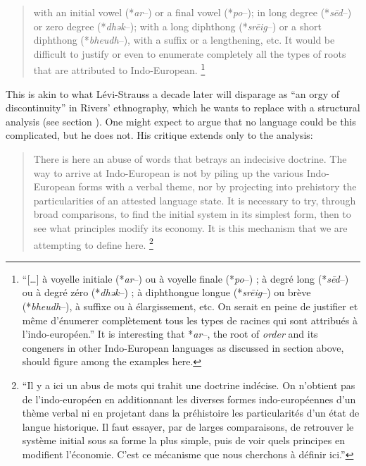 \documentclass[output=paper]{langscibook}
\begin{document}
\begin{quotation}
with an initial vowel (*\emph{ar}--) or a final vowel (*\emph{po}--); in long degree (*\emph{sēd}--) or zero degree (*\emph{dhək}--); with a long diphthong (*\emph{srēig}--) or a short diphthong (*\emph{bheudh}--), with a suffix or a lengthening, etc. It would be difficult to justify or even to enumerate completely all the types of roots that are attributed to Indo-European. \citep[147]{Benveniste1935}\footnote{``[…] à voyelle initiale (*\emph{ar}--) ou à voyelle finale (*\emph{po}--) ; à degré long (*\emph{sēd}--) ou à degré zéro (*\emph{dhək}--) ; à diphthongue longue (*\emph{srēig}--) ou brève (*\emph{bheudh}--), à suffixe ou à élargissement, etc. On serait en peine de justifier et même d’énumerer complètement tous les types de racines qui sont attribués à l’indo-européen.'' It is interesting that *\emph{ar}--, the root of \emph{order} and its congeners in other Indo-European languages as discussed in section  above, should figure among the examples here.}
\end{quotation}

This is akin to what Lévi-Strauss a decade later will disparage as ``an orgy of discontinuity'' in Rivers' ethnography, which he wants to replace with a structural analysis (see section ). One might expect {\Benveniste} to argue that no language could be this complicated, but he does not. His critique extends only to the analysis:

\begin{quotation}
There is here an abuse of words that betrays an indecisive doctrine. The way to arrive at Indo-European is not by piling up the various Indo-Eu\-ro\-pe\-an forms with a verbal theme, nor by projecting into prehistory the particularities of an attested language state. It is necessary to try, through broad comparisons, to find the initial system in its simplest form, then to see what principles modify its economy. It is this mechanism that we are attempting to define here. \citep[147--148]{Benveniste1935}\footnote{``Il y a ici un abus de mots qui trahit une doctrine indécise. On n'obtient pas de l'indo-européen en additionnant les diverses formes indo-européennes d'un thème verbal ni en projetant dans la préhistoire les particularités d'un état de langue historique. Il faut essayer, par de larges comparaisons, de retrouver le système initial sous sa forme la plus simple, puis de voir quels principes en modifient l'économie. C'est ce mécanisme que nous cherchons à définir ici.''}
\end{quotation}
\end{document}
